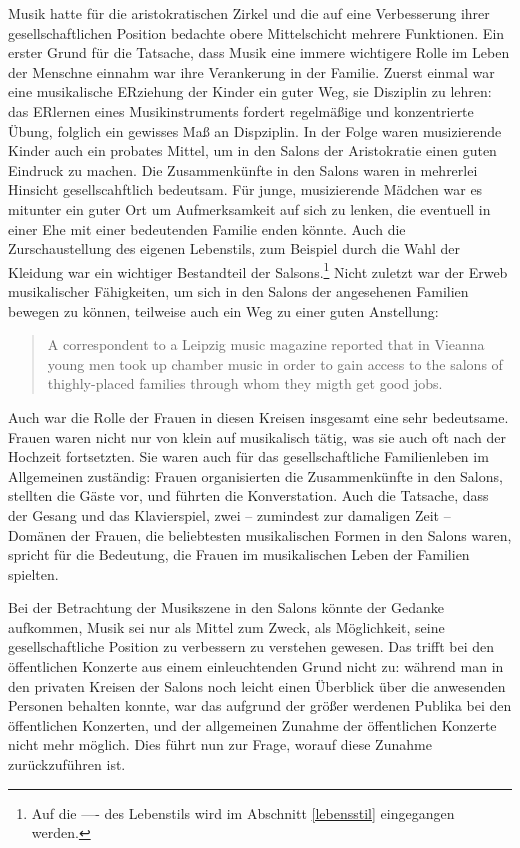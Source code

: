 \documentclass[a4paper, german, oneside]{scrbook}
\begin{document}
Musik hatte für die aristokratischen Zirkel und die auf eine Verbesserung ihrer gesellschaftlichen Position bedachte obere Mittelschicht mehrere Funktionen. Ein erster Grund für die Tatsache, dass Musik eine immere wichtigere Rolle im Leben der Menschne einnahm war ihre Verankerung in der Familie. Zuerst einmal war eine musikalische ERziehung der Kinder ein guter Weg, sie Disziplin zu lehren: das ERlernen eines Musikinstruments fordert regelmäßige und konzentrierte Übung, folglich ein gewisses Maß an Dispziplin. \parencite[35ff.]{weber_music_2004} In der Folge waren musizierende Kinder auch ein probates Mittel, um in den Salons der Aristokratie einen guten Eindruck zu machen. Die Zusammenkünfte in den Salons waren in mehrerlei Hinsicht gesellscahftlich bedeutsam. Für junge, musizierende Mädchen war es mitunter ein guter Ort um Aufmerksamkeit auf sich zu lenken, die eventuell in einer Ehe mit einer bedeutenden Familie enden könnte. Auch die Zurschaustellung des eigenen Lebenstils, zum Beispiel durch die Wahl der Kleidung war ein wichtiger Bestandteil der Salsons.\footnote{Auf die ---- des Lebenstils wird im Abschnitt \ref{lebensstil} eingegangen werden.} Nicht zuletzt war der Erweb musikalischer Fähigkeiten, um sich in den Salons der angesehenen Familien bewegen zu können, teilweise auch ein Weg zu einer guten Anstellung: \blockquote[{\cite[37]{weber_music_2004}}]{A correspondent to a Leipzig music magazine reported that in Vieanna young men took up chamber music in order to gain access to the salons of thighly-placed families through whom they migth get good jobs.}

Auch war die Rolle der Frauen in diesen Kreisen insgesamt eine sehr bedeutsame. Frauen waren nicht nur von klein auf musikalisch tätig, was sie auch oft nach der Hochzeit fortsetzten. Sie waren auch für das gesellschaftliche Familienleben im Allgemeinen zuständig: Frauen organisierten die Zusammenkünfte in den Salons, stellten die Gäste vor, und führten die Konverstation. Auch die Tatsache, dass der Gesang und das Klavierspiel, zwei -- zumindest zur damaligen Zeit -- Domänen der Frauen, die beliebtesten musikalischen Formen in den Salons waren, spricht für die Bedeutung, die Frauen im musikalischen Leben der Familien spielten. \parencite[41]{weber_music_2004}

Bei der Betrachtung der Musikszene in den Salons könnte der Gedanke aufkommen, Musik sei nur als Mittel zum Zweck, als Möglichkeit, seine gesellschaftliche Position zu verbessern zu verstehen gewesen. Das trifft bei den öffentlichen Konzerte aus einem einleuchtenden Grund nicht zu: während man in den privaten Kreisen der Salons noch leicht einen Überblick über die anwesenden Personen behalten konnte, war das aufgrund der größer werdenen Publika bei den öffentlichen Konzerten, und der allgemeinen Zunahme der öffentlichen Konzerte nicht mehr möglich. \parencite[37]{weber_music_2004} Dies führt nun zur Frage, worauf diese Zunahme zurückzuführen ist. 
\end{document}
